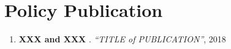 
\section{Policy Publication}
\vspace{-.25in}
\begin{enumerate}
	\item {\bf XXX and XXX }. \textit{``TITLE of PUBLICATION''}, 2018
\end{enumerate} 

